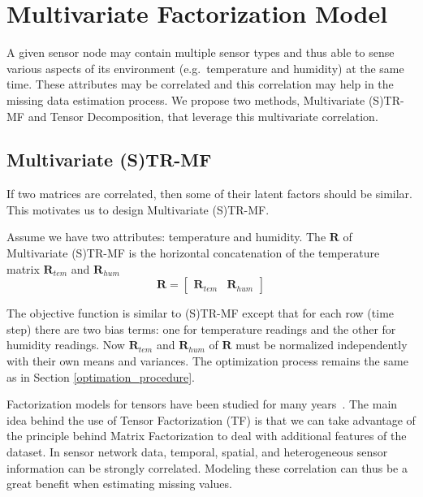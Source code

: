 
\section{Multivariate Factorization Model} \label{sec:tf}
A given sensor node may contain multiple sensor types and thus able to sense various aspects of its environment (e.g.\ temperature and humidity) at the same time.
These attributes may be correlated and this correlation may help in the missing data estimation process.
We propose two methods, Multivariate (S)TR-MF and Tensor Decomposition, that leverage this multivariate correlation.

\subsection{Multivariate (S)TR-MF} %
If two matrices are correlated, then some of their latent factors should be similar.
This motivates us to design Multivariate (S)TR-MF.

Assume we have two attributes: temperature and humidity.
The $\mathbf{R}$ of Multivariate (S)TR-MF is the horizontal concatenation of the temperature matrix $\mathbf{R}_{tem}$ and $\mathbf{R}_{hum}$
\begin{equation*} \mathbf{R} = \begin{bmatrix}\mathbf{R}_{tem} & \mathbf{R}_{hum} \end{bmatrix} \end{equation*}

The objective function is similar to (S)TR-MF except that for each row (time step) there are two bias terms: one for temperature readings and the other for humidity readings.
Now $\mathbf{R}_{tem}$ and $\mathbf{R}_{hum}$ of $\mathbf{R}$ must be normalized independently with their own means and variances.
The optimization process remains the same as in Section \ref{optimation_procedure}.


Factorization models for tensors have been studied for many years~\cite{karatzoglou2010multiverse}.
The main idea behind the use of Tensor Factorization (TF) is that we can take advantage of the principle behind Matrix Factorization to deal with additional features of the dataset. %
In sensor network data, temporal, spatial, and heterogeneous sensor information can be strongly correlated.
Modeling these correlation can thus be a great benefit when estimating missing values.
 
